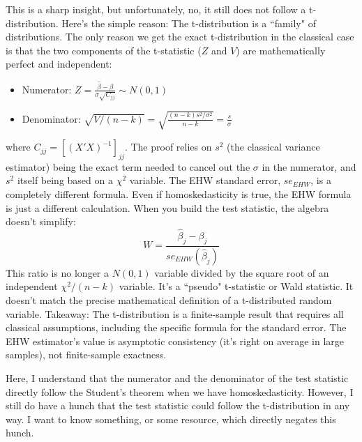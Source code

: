 \documentclass[11pt]{article}
\numberwithin{equation}{section}
\theoremstyle{definition}
\begin{document}
\begin{tcolorbox}[colback=lightgray, colframe=black, title={Query(Gemini AI):  But even if I use EHW, if the homoskedasticity assumption does hold true, then since EHW is also unbiased estimator of the true standard deviation in that case, wouldn't I still have t-dstibution?}, breakable]
    This is a sharp insight, but unfortunately, no, it still does not follow a t-distribution.
    Here's the simple reason: The t-distribution is a ``family" of distributions. 
    The only reason we get the exact t-distribution in the classical case is that the two components of the t-statistic ($Z$ and $V$) are mathematically perfect and independent:
    \begin{itemize}
        \item Numerator: $Z = \frac{\hat{\beta} - \beta}{\sigma\sqrt{C_{jj}}} \sim N(0,1)$
        \item Denominator: $\sqrt{V/(n-k)} = \sqrt{\frac{(n-k)s^2/\sigma^2}{n-k}} = \frac{s}{\sigma}$
    \end{itemize}
    where $C_{jj} = [(X'X)^{-1}]_{jj}$.
    The proof relies on $s^2$ (the classical variance estimator) being the exact term needed to cancel out the $\sigma$ in the numerator, and $s^2$ itself being based on a $\chi^2$ variable.
    The EHW standard error, $se_{EHW}$, is a completely different formula. 
    Even if homoskedasticity is true, the EHW formula is just a different calculation. 
    When you build the test statistic, the algebra doesn't simplify:
    $$W = \frac{\hat{\beta}_j - \beta_j}{se_{EHW}(\hat{\beta}_j)}$$
    This ratio is no longer a $N(0,1)$ variable divided by the square root of an independent $\chi^2/(n-k)$ variable. It's a ``pseudo" t-statistic or Wald statistic. 
    It doesn't match the precise mathematical definition of a t-distributed random variable.
    Takeaway: The t-distribution is a finite-sample result that requires all classical assumptions, including the specific formula for the standard error. The EHW estimator's value is asymptotic consistency (it's right on average in large samples), not finite-sample exactness.
\end{tcolorbox}

Here, I understand that the numerator and the denominator of the test statistic directly follow the Student's theorem when we have homoskedasticity.
However, I still do have a hunch that the test statistic could follow the t-distribution in any way. I want to know something, or some resource, which directly negates this hunch.
\end{document}
